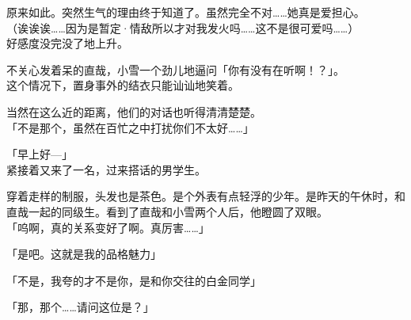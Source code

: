 原来如此。突然生气的理由终于知道了。虽然完全不对……她真是爱担心。\\

（诶诶诶……因为是暂定·情敌所以才对我发火吗……这不是很可爱吗……）\\

好感度没完没了地上升。

不关心发着呆的直哉，小雪一个劲儿地逼问「你有没有在听啊！？」。\\

这个情况下，置身事外的结衣只能讪讪地笑着。

当然在这么近的距离，他们的对话也听得清清楚楚。\\

「不是那个，虽然在百忙之中打扰你们不太好……」

「早上好—」\\

紧接着又来了一名，过来搭话的男学生。

穿着走样的制服，头发也是茶色。是个外表有点轻浮的少年。是昨天的午休时，和直哉一起的同级生。看到了直哉和小雪两个人后，他瞪圆了双眼。\\

「呜啊，真的关系变好了啊。真厉害……」

「是吧。这就是我的品格魅力」

「不是，我夸的才不是你，是和你交往的白金同学」

「那，那个……请问这位是？」\\

